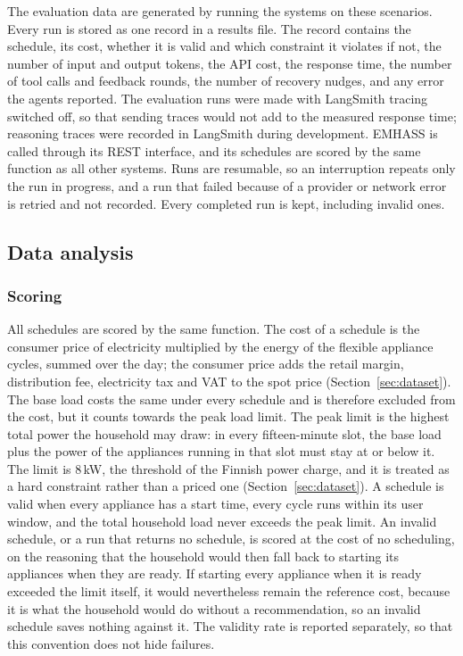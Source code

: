 \documentclass[12pt,a4paper]{report}
\begin{document}
The evaluation data are generated by running the systems on these
scenarios. Every run is stored as one record in a results file. The
record contains the schedule, its cost, whether it is valid and which
constraint it violates if not, the number of input and output tokens,
the API cost, the response time, the number of tool calls and feedback
rounds, the number of recovery nudges, and any error the agents
reported. The evaluation runs were made with LangSmith tracing switched
off, so that sending traces would not add to the measured response
time; reasoning traces were recorded in LangSmith during development.
EMHASS is called through its REST interface, and its schedules are
scored by the same function as all other systems. Runs are resumable,
so an interruption repeats only the run in progress, and a run that
failed because of a provider or network error is retried and not
recorded. Every completed run is kept, including invalid ones.

\subsection{Data analysis}
\label{sec:data-analysis}

\subsubsection*{Scoring}

All schedules are scored by the same function. The cost of a schedule is
the consumer price of electricity multiplied by the energy of the flexible
appliance cycles, summed over the day; the consumer price adds the retail
margin, distribution fee, electricity tax and VAT to the spot price
(Section~\ref{sec:dataset}). The base load costs the same under every
schedule and is therefore excluded from the cost, but it counts towards
the peak load limit. The peak limit is the highest total power the
household may draw: in every fifteen-minute slot, the base load plus the
power of the appliances running in that slot must stay at or below it.
The limit is 8\,kW, the threshold of the Finnish power charge, and it is
treated as a hard constraint rather than a priced one
(Section~\ref{sec:dataset}). A schedule is valid when every appliance has
a start time, every cycle runs within its user window, and the total
household load never exceeds the peak limit. An invalid schedule, or a
run that returns no schedule, is scored at the cost of no scheduling, on
the reasoning that the household would then fall back to starting its
appliances when they are ready. If starting every appliance when it is
ready exceeded the limit itself, it would nevertheless remain the
reference cost, because it
is what the household would do without a recommendation, so an invalid
schedule saves nothing against it. The validity rate is reported
separately, so that this convention does not hide failures.
\end{document}

